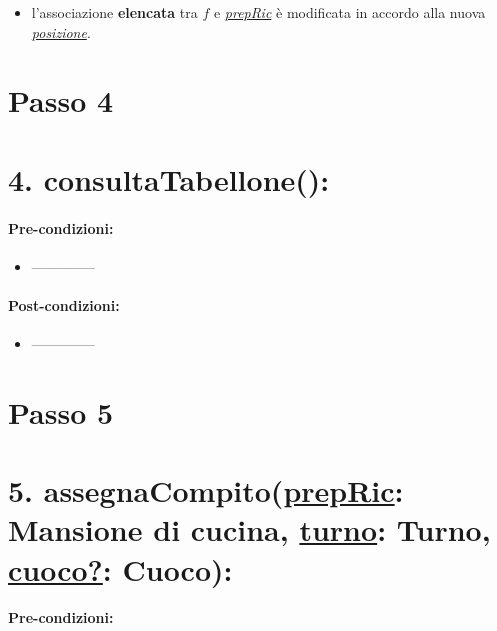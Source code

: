 \begin{itemize}
  \item l'associazione \textbf{elencata} tra $f$ e \underline{\textit{prepRic}} è modificata in accordo alla nuova \underline{\textit{posizione}}.
\end{itemize}

\section{Passo 4}

\section*{4. consultaTabellone():}

\paragraph{Pre-condizioni:}

\begin{itemize}
  \item --------------
\end{itemize}

\paragraph{Post-condizioni:}

\begin{itemize}
  \item --------------
\end{itemize}


\section{Passo 5}

\section*{5. assegnaCompito(\underline{prepRic}: Mansione di cucina, \underline{turno}: Turno, \underline{cuoco?}: Cuoco):}

\paragraph{Pre-condizioni:}

